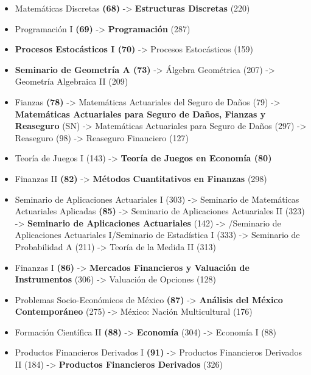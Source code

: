 \begin{appendices}
\begin{itemize}
  \item Matemáticas Discretas \textbf{(68)} -> \textbf{Estructuras Discretas} (220)
  
  \item Programación I \textbf{(69)} -> \textbf{Programación} (287)
  
  \item \textbf{Procesos Estocásticos I (70)} -> Procesos Estocásticos (159)

  \item \textbf{Seminario de Geometría A (73)} -> Álgebra Geométrica (207) -> Geometría Algebraica II (209)
  
  \item Fianzas \textbf{(78)} -> Matemáticas Actuariales del Seguro de Daños (79) -> \textbf{Matemáticas Actuariales para Seguro de Daños, Fianzas y Reaseguro} (SN) -> Matemáticas Actuariales para Seguro de Daños (297) -> Reaseguro (98) -> Reaseguro Financiero (127)
  
  \item Teoría de Juegos I (143) -> \textbf{Teoría de Juegos en Economía (80)}

  \item Finanzas II \textbf{(82)} -> \textbf{Métodos Cuantitativos en Finanzas} (298)
  
  \item Seminario de Aplicaciones Actuariales I (303) -> Seminario de Matemáticas Actuariales Aplicadas \textbf{(85)} -> Seminario de Aplicaciones Actuariales II (323) -> \textbf{Seminario de Aplicaciones Actuariales} (142) -> /Seminario de Aplicaciones Actuariales I/Seminario de Estadística I (333) -> Seminario de Probabilidad A (211) -> Teoría de la Medida II (313)
  
  \item Finanzas I \textbf{(86)} -> \textbf{Mercados Financieros y Valuación de Instrumentos} (306) -> Valuación de Opciones (128)

  \item Problemas Socio-Económicos de México \textbf{(87)} -> \textbf{Análisis del México Contemporáneo} (275) -> México: Nación Multicultural (176)
  
  \item Formación Científica II \textbf{(88)} -> \textbf{Economía} (304) -> Economía I (88)

  \item Productos Financieros Derivados I \textbf{(91)} -> Productos Financieros Derivados II (184) -> \textbf{Productos Financieros Derivados} (326)
  

\end{itemize}
\end{appendices}

